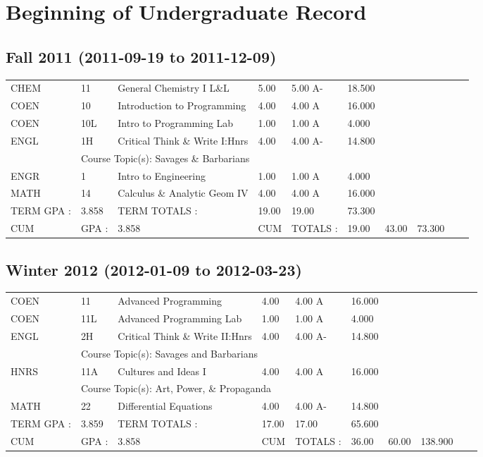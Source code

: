 \documentclass{scrartcl}\usepackage[T1]{fontenc}
\begin{document}
\section{Beginning of Undergraduate Record}
\subsection{Fall 2011	(2011-09-19 to 2011-12-09)}
\begin{tabular}{ l  l  l  l  l  l  l  l  l  l }
CHEM&11&General Chemistry I L\&L&5.00&5.00 A-&18.500& & & & \\
COEN&10&Introduction to Programming&4.00&4.00 A&16.000& & & & \\
COEN&10L&Intro to Programming Lab&1.00&1.00 A&4.000& & & & \\
ENGL&1H&Critical Think \& Write I:Hnrs&4.00&4.00 A-&14.800& & & & \\
\multicolumn{1}{l}{ }
&
\multicolumn{9}{l}{Course Topic(s): Savages \& Barbarians}
\\
ENGR&1&Intro to Engineering&1.00&1.00 A&4.000& & & & \\
MATH&14&Calculus \& Analytic Geom IV&4.00&4.00 A&16.000& & & & \\
\hline
TERM GPA :&3.858&TERM TOTALS :&19.00&19.00&73.300& & & & \\
CUM&GPA :&3.858&CUM&TOTALS :&19.00&43.00&73.300& & \\\end{tabular}
\subsection{Winter 2012	(2012-01-09 to 2012-03-23)}
\begin{tabular}{ l  l  l  l  l  l  l  l  l  l }
COEN&11&Advanced Programming&4.00&4.00 A&16.000& & & & \\
COEN&11L&Advanced Programming Lab&1.00&1.00 A&4.000& & & & \\
ENGL&2H&Critical Think \& Write II:Hnrs&4.00&4.00 A-&14.800& & & & \\
\multicolumn{1}{l}{ }
&
\multicolumn{9}{l}{Course Topic(s): Savages and Barbarians}
\\
HNRS&11A&Cultures and Ideas I&4.00&4.00 A&16.000& & & & \\
\multicolumn{1}{l}{ }
&
\multicolumn{9}{l}{Course Topic(s): Art, Power, \& Propaganda}
\\
MATH&22&Differential Equations&4.00&4.00 A-&14.800& & & & \\
\hline
TERM GPA :&3.859&TERM TOTALS :&17.00&17.00&65.600& & & & \\
CUM&GPA :&3.858&CUM&TOTALS :&36.00&60.00&138.900& & \\\end{tabular}
\end{document}
